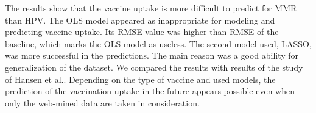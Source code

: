 \documentclass{sig-alternate}
\begin{document}
The results show that the vaccine uptake is more difficult to predict for MMR than HPV.
The OLS model appeared as inappropriate for modeling and predicting vaccine uptake.
Its RMSE value was higher than RMSE of the baseline, which marks the OLS model as useless.
The second model used, LASSO, was more successful in the predictions.
The main reason was a good ability for generalization of the dataset.
We compared the results with results of the study of Hansen et al.\cite{H2016}.
Depending on the type of vaccine and used models, the prediction of the vaccination uptake in the future appears possible even when only the web-mined data are taken in consideration.



%
%
\end{document}
